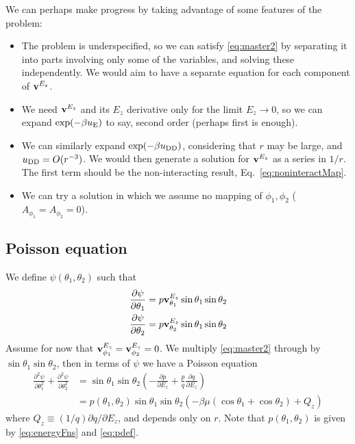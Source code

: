 \documentclass[11pt,reqno]{amsart}
\begin{document}
We can perhaps make progress by taking advantage of some features of the problem:
\begin{itemize}
\item The problem is underspecified, so we can satisfy \eqref{eq:master2} by separating it into parts involving only some of the variables, and solving these independently. We would aim to have a separate equation for each component of ${\bf v}^{E_z}$.
\item We need ${\bf v}^{E_z}$ and its $E_z$ derivative only for the limit $E_z\to0$, so we can expand $\exp(-\beta u_{\rm E})$ to say, second order (perhaps first is enough).
\item We can similarly expand $\exp(-\beta u_{\rm DD})$, considering that $r$ may be large, and $u_{\rm DD} = O(r^{-3})$. We would then generate a solution for ${\bf v}^{E_z}$ as a series in $1/r$. The first term should be the non-interacting result, Eq.~\eqref{eq:noninteractMap}.
\item We can try a solution in which we assume no mapping of $\phi_1, \phi_2$ ($A_{\phi_1} = A_{\phi_2} = 0$).  
\end{itemize}

\subsection{Poisson equation} 
We define $\psi(\theta_1,\theta_2)$ such that
\begin{subequations}
\label{eq:psiDef}
\begin{align}
&\frac{\partial \psi}{\partial \theta_1} = p {\bf v}^{E_z}_{\theta_1} \sin\theta_1\sin\theta_2\\
&\frac{\partial \psi}{\partial \theta_2} = p {\bf v}^{E_z}_{\theta_2} \sin\theta_1\sin\theta_2
\end{align}
\end{subequations}
Assume for now that ${\bf v}^{E_z}_{\phi_1} = {\bf v}^{E_z}_{\phi_2} = 0$. We multiply \eqref{eq:master2} through by $\sin\theta_1\sin\theta_2$, then in terms of $\psi$ we have a Poisson equation
\begin{align}
\frac{\partial^2 \psi}{\partial \theta_1^2} + \frac{\partial^2 \psi}{\partial \theta_2^2} &= \sin\theta_1\sin\theta_2 \left(-\frac{\partial p}{\partial E_z}+\frac{p}{q}\frac{\partial q}{\partial E_z}\right)\nonumber\\
&= p(\theta_1,\theta_2)\sin\theta_1\sin\theta_2 \left(-\beta\mu(\cos\theta_1+\cos\theta_2)+Q_z\right)
\end{align}
where $Q_z \equiv (1/q)\partial q/\partial E_z$, and depends only on $r$. Note that $p(\theta_1,\theta_2)$ is given by  \eqref{eq:energyFns} and \eqref{eq:pdef}.
\end{document}

